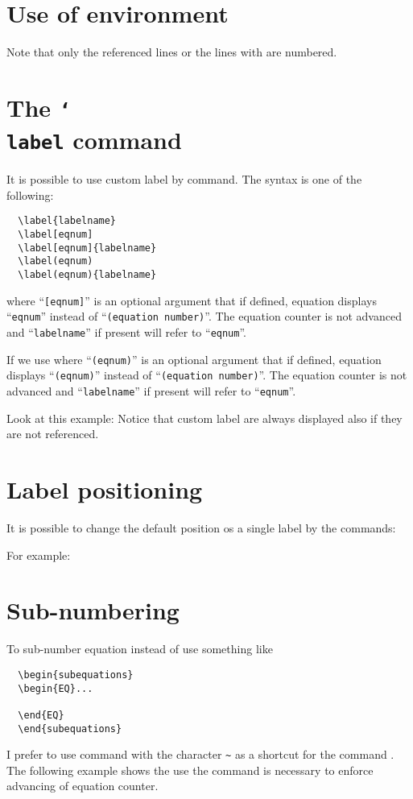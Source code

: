 \documentclass[a4paper]{article}
\begin{document}
\section{Use of  environment}
%
%
Note that only the referenced lines or the lines with 
 are numbered.


\section{The \texttt{\char`\\label} command}
It is possible to use custom label by  command. 
The syntax is one of the following:
\begin{verbatim}
  \label{labelname}
  \label[eqnum]
  \label[eqnum]{labelname}
  \label(eqnum)
  \label(eqnum){labelname}
\end{verbatim}
where ``\verb'[eqnum]''' is an optional argument that if defined,
equation displays ``\verb'eqnum''' instead of
``\verb'(equation number)'''.  The equation counter is not advanced and
``\verb'labelname''' if present will refer to ``\verb'eqnum'''.

If we use where ``\verb'(eqnum)''' is an optional argument that if
defined, equation displays ``\verb'(eqnum)''' instead of
``\verb'(equation number)'''.  The equation counter is not advanced
and ``\verb'labelname''' if present will refer to ``\verb'eqnum'''.

Look at this example:
%
%
Notice that custom label are always displayed also if they are
not referenced.

\section{Label positioning}
It is possible to change the default position os a single 
label by the commands:
\begin{dotlist}
  \item{}
  \item{}
  \item{}
\end{dotlist}
For example:
%
%


\section{Sub-numbering}
To sub-number equation instead of use something like
%
\begin{verbatim}
  \begin{subequations}
  \begin{EQ}...
    
  \end{EQ}
  \end{subequations}
\end{verbatim}
%
I prefer to use  command with the character \verb'~'
as a shortcut for the command . The following example shows 
the use
%
%
the  command is necessary to enforce advancing of 
equation counter.
\end{document}

